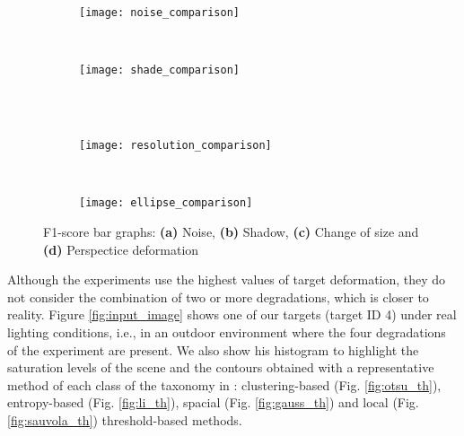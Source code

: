 \begin{figure}[!ht]
    \centering
    \begin{subfigure}[b]{0.4\textwidth}
        \texttt{[image: noise\_comparison]}
        \caption{}
        \label{fig:noise_graph}
    \end{subfigure}
        ~ %
    \begin{subfigure}[b]{0.4\textwidth}
        \texttt{[image: shade\_comparison]}
        \caption{}
        \label{fig:shadow_graph}
    \end{subfigure}\\
        ~ %
    \begin{subfigure}[b]{0.4\textwidth}
        \texttt{[image: resolution\_comparison]}
        \caption{}
        \label{fig:resolution_graph}
    \end{subfigure}
        ~ %
    \begin{subfigure}[b]{0.4\textwidth}
        \texttt{[image: ellipse\_comparison]}
        \caption{}
        \label{fig:deformation_graph}
    \end{subfigure}
    \caption{F1-score bar graphs: \textbf{(a)} Noise, \textbf{(b)} Shadow, \textbf{(c)} Change of size and \textbf{(d)} Perspectice deformation}\label{fig:degradations_graphs}
\end{figure}

Although the experiments use the highest values of target deformation, they do not consider the combination of two or more degradations, which is closer to reality. Figure \ref{fig:input_image} shows one of our targets (target ID 4) under real lighting conditions, i.e., in an outdoor environment where the four degradations of the experiment are present. We also show his histogram to highlight the saturation levels of the scene and the contours obtained with a representative method of each class of the taxonomy in \citep{Sezgin.Sankur:EI:2010}: clustering-based (Fig. \ref{fig:otsu_th}), entropy-based (Fig. \ref{fig:li_th}), spacial (Fig. \ref{fig:gauss_th}) and local (Fig. \ref{fig:sauvola_th}) threshold-based methods. 

